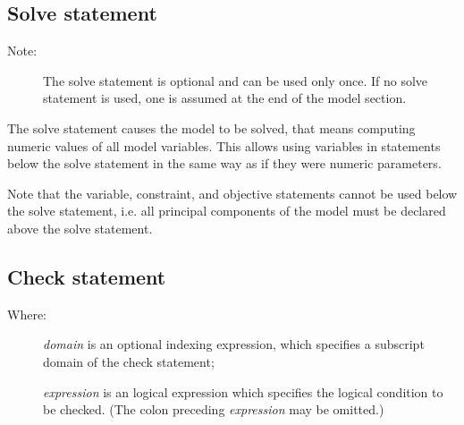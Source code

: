 \documentclass[10pt]{article}
\begin{document}
\subsection{Solve statement}

\medskip

\framebox[345pt][l]{
\parbox[c][24pt]{345pt}{
\hspace{6pt} {\tt solve} {\tt;}
}}

\setlength{\leftmargini}{60pt}

\begin{description}
\item[{\rm Note:}\hspace*{31pt}] The solve statement is optional and
can be used only once. If no solve statement is used, one is assumed at
the end of the model section.
\end{description}

The solve statement causes the model to be solved, that means computing
numeric values of all model variables. This allows using variables in
statements below the solve statement in the same way as if they were
numeric parameters.

Note that the variable, constraint, and objective statements cannot be
used below the solve statement, i.e. all principal components of the
model must be declared above the solve statement.

\subsection{Check statement}

\medskip


\setlength{\leftmargini}{60pt}

\begin{description}
\item[{\rm Where:}\hspace*{23pt}] {\it domain} is an optional indexing
expression, which specifies a subscript domain of the check statement;
\item[\hspace*{54pt}] {\it expression} is an logical expression which
specifies the logical condition to be checked. (The colon preceding
{\it expression} may be omitted.)
\end{description}
\end{document}
